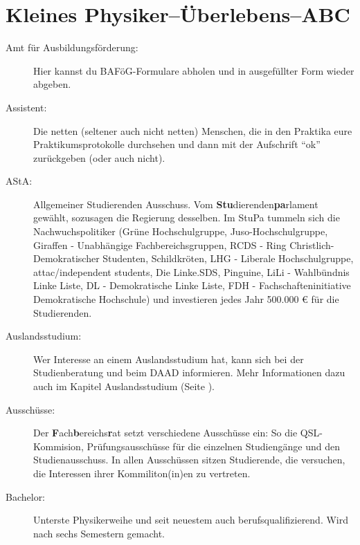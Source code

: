 \section{Kleines Physiker--Überlebens--ABC}


\begin{description}
    \item[Amt für Ausbildungsförderung:] Hier kannst du BAFöG-Formulare
abholen und in ausgefüllter Form wieder abgeben.

    \item[Assistent:] Die
netten (seltener auch nicht netten) Menschen, die in den Praktika
eure Praktikumsprotokolle durchsehen und dann mit der Aufschrift
"`ok"' zurückgeben (oder auch nicht).

    \item[AStA:]Allgemeiner Studierenden Ausschuss.
      Vom \textbf{Stu}dierenden\textbf{pa}rlament gewählt, sozusagen die Regierung desselben.
      Im StuPa tummeln sich die Nachwuchspolitiker
      (Grüne Hochschulgruppe, Juso-Hochschulgruppe, Giraffen - Unabhängige Fachbereichsgruppen,
      RCDS - Ring Christlich-Demokratischer Studenten, Schildkröten, LHG - Liberale Hochschulgruppe,
      attac/independent students, Die Linke.SDS, Pinguine, LiLi - Wahlbündnis Linke Liste,
      DL - Demokratische Linke Liste, FDH - Fachschafteninitiative Demokratische Hochschule)
      und investieren jedes Jahr 500.000 \euro{} für die Studierenden.

    \item[Auslandsstudium:]Wer Interesse an einem Auslandsstudium hat, kann sich bei der Studienberatung
      und beim DAAD informieren.
      Mehr Informationen dazu auch im Kapitel Auslandsstudium (Seite \pageref{sec:Ausland}).

    \item[Ausschüsse:]Der \textbf{F}ach\textbf{b}ereichs\textbf{r}at setzt
verschiedene Ausschüsse ein: So die QSL-Kommision, Prüfungsausschüsse für die einzelnen Studiengänge
und den Studienausschuss.
In allen Ausschüssen sitzen Studierende, die versuchen, die Interessen ihrer Kommiliton(in)en zu
vertreten.

    \item[Bachelor:]Unterste Physikerweihe und seit neuestem auch
berufsqualifizierend. Wird nach sechs Semestern gemacht.


\end{description}
